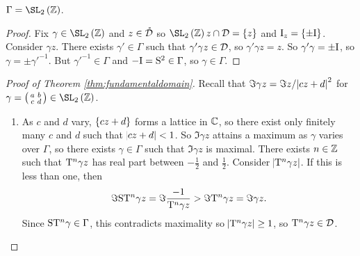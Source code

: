 \begin{corollary}
$ \Gamma = \SL_2\br{\ZZ} $.
\end{corollary}

\begin{proof}
Fix $ \gamma \in \SL_2\br{\ZZ} $ and $ z \in \mathring{\mathcal{D}} $ so $ \SL_2\br{\ZZ}z \cap \DDD = \cbr{z} $ and $ \I_z = \cbr{\pm\I} $. Consider $ \gamma z $. There exists $ \gamma' \in \Gamma $ such that $ \gamma'\gamma z \in \mathcal{D} $, so $ \gamma'\gamma z = z $. So $ \gamma'\gamma = \pm\mathrm{I} $, so $ \gamma = \pm\gamma'^{-1} $. But $ \gamma'^{-1} \in \Gamma $ and $ -\mathrm{I} = \mathrm{S}^2 \in \Gamma $, so $ \gamma \in \Gamma $.
\end{proof}

\pagebreak

\begin{proof}[Proof of Theorem \ref{thm:fundamentaldomain}]
Recall that $ \Im \gamma z = \Im z / \abs{cz + d}^2 $ for $ \gamma = \twobytwosmall{a}{b}{c}{d} \in \SL_2\br{\ZZ} $.
\begin{enumerate}
\item As $ c $ and $ d $ vary, $ \cbr{cz + d} $ forms a lattice in $ \mathbb{C} $, so there exist only finitely many $ c $ and $ d $ such that $ \abs{cz + d} < 1 $. So $ \Im \gamma z $ attains a maximum as $ \gamma $ varies over $ \Gamma $, so there exists $ \gamma \in \Gamma $ such that $ \Im \gamma z $ is maximal. There exists $ n \in \mathbb{Z} $ such that $ \mathrm{T}^n\gamma z $ has real part between $ -\tfrac{1}{2} $ and $ \tfrac{1}{2} $. Consider $ \abs{\mathrm{T}^n\gamma z} $. If this is less than one, then
$$ \Im \mathrm{S}\mathrm{T}^n\gamma z = \Im \dfrac{-1}{\mathrm{T}^n\gamma z} > \Im \mathrm{T}^n\gamma z = \Im \gamma z. $$
Since $ \mathrm{S}\mathrm{T}^n\gamma \in \Gamma $, this contradicts maximality so $ \abs{\mathrm{T}^n\gamma z} \ge 1 $, so $ \mathrm{T}^n\gamma z \in \mathcal{D} $.



\end{enumerate}
\end{proof}
